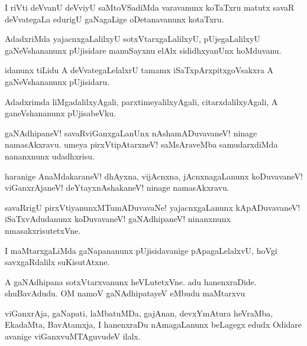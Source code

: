\documentclass{article}
\begin{document}
\begin{mng}%
I riVti deVvanU deVviyU saMtoVSadiMda varavanunx koTaTxru matutx savaR 
deVvategaLa edurigU gaNagaLige oDetanavanunx kotaTxru.
\end{mng}

\begin{mng}%
AdadxriMda yajacnxgaLalilxyU sotxVtarxgaLalilxyU, pUjegaLalilxyU 
gaNeVshananunx pUjisidare manuSayxnu elAlx sididhxyanUnx hoMduvanu.
\end{mng}

\begin{mng}%
idanunx tiLidu A deVvategaLelalxrU tamamx iSaTxpArxpitxgoVsakxra A 
gaNeVshananunx pUjisidaru.
\end{mng}

\begin{mng}%
Adadxrimda liMgadalilxyAgali, parxtimeyalilxyAgali, 
citarxdalilxyAgali, A ganeVshananunx pUjisabeVku.
\end{mng}

\begin{mng}%
gaNAdhipaneV! savaRviGanxgaLanUnx nAshamADuvavaneV! ninage 
namasAkxravu. umeya pirxVtipAtarxneV! saMsAraveMba samudarxdiMda 
nananxnunx udadhxrisu.
\end{mng}

\begin{mng}%
haranige AnaMdakaraneV! dhAyxna, vijAcnxna, jAcnxnagaLanunx 
koDuvavaneV! viGanxrAjaneV! deYtayxnAshakaneV! ninage namasAkxravu.
\end{mng}

\begin{mng}%
savaRrigU pirxVtiyanunxMTumADuvavaNe! yajacnxgaLanunx kApADuvavaneV! 
iSaTxvAdudanunx koDuvavaneV! gaNAdhipaneV! ninanxnunx 
nmasakxrisutetxVne.
\end{mng}

\begin{mng}%
I maMtarxgaLiMda gaNapananunx pUjisidavanige pApagaLelalxvU, hoVgi savxgaRdalilx suKisutAtxne.
\end{mng}

\begin{mng}%
A gaNAdhipana sotxVtarxvanunx heVLutetxVne. adu hanenxraDide. shuBavAdudu. OM namoV gaNAdhipatayeV eMbudu maMtarxvu
\end{mng}

\begin{mng}%
viGanxrAja, gaNapati, laMbatuMDa, gajAnan, devxYmAtura heVraMba, EkadaMta, BavAtamxja, I hanenxraDu nAmagaLanunx beLagegx edudx Odidare avanige viGanxvuMTAguvudeV ilalx.
\end{mng}
\end{document}
